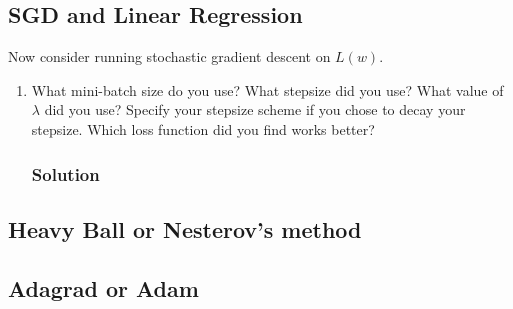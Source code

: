 \documentclass[letterpaper,11pt]{article}
\begin{document}
\subsection*{SGD and Linear Regression}

Now consider running stochastic gradient descent on $L(w)$.

\begin{enumerate}  
\item What mini-batch size do you use? What stepsize did you use? What value of
  $\lambda$ did you use? Specify your stepsize scheme if you chose to decay your
  stepsize. Which loss function did you find works better?

  \subsubsection*{Solution}
\end{enumerate}

\subsection*{Heavy Ball or Nesterov's method}

\subsection*{Adagrad or Adam}
\end{document}
